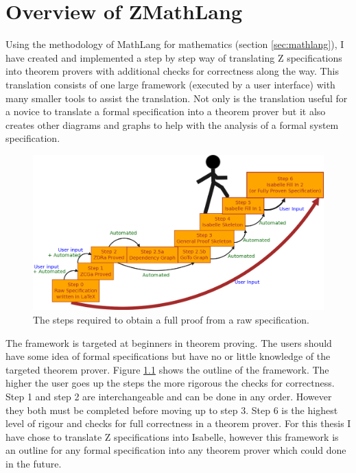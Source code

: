 
\chapter{Overview of ZMathLang}
\label{ch:design}

Using the methodology of MathLang for mathematics (section \ref{sec:mathlang}),
I have created and implemented a step by step way of translating Z
specifications into theorem provers with additional checks for correctness along
the way. This translation consists of one large framework (executed by a user
interface) with many smaller tools to assist the translation. Not only is the
translation useful for a novice to translate a formal specification into a
theorem prover but it also creates other diagrams and graphs to help with the
analysis of a formal system specification.

\begin{figure}[H]
 \begin{center}
 \includegraphics [width=12cm]{Figures/Design/mathlangsteps.png}
 \caption{The steps required to obtain a full proof from a raw specification.}
 \label{fig:steps}
\end{center}
\end{figure} 

The framework is targeted at beginners in theorem proving. The users should have
some idea of formal specifications but have no or little knowledge of the
targeted theorem prover. Figure \ref{fig:steps} shows the outline of the
framework. The higher the user goes up the steps the more rigorous the checks
for correctness. Step 1 and step 2 are interchangeable and can be done in any
order. However they both must be completed before moving up to step 3. Step 6 is
the highest level of rigour and checks for full correctness in a theorem prover.
For this thesis I have chose to translate Z specifications into Isabelle,
however this framework is an outline for any formal specification into any
theorem prover which could done in the future.

